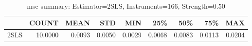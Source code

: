 \begin{table}[ht]
\centering
\caption{mse summary: Estimator=2SLS, Instruments=166, Strength=0.50}
\begin{tabular}{lrrrrrrrr}
\toprule
 & COUNT & MEAN & STD & MIN & 25\% & 50\% & 75\% & MAX \\
\midrule
2SLS & 10.0000 & 0.0093 & 0.0050 & 0.0029 & 0.0068 & 0.0083 & 0.0113 & 0.0204 \\
\bottomrule
\end{tabular}
\end{table}
